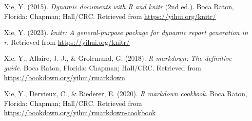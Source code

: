 \documentclass[
]{agujournal2019}
\newlength{\cslhangindent}
\newenvironment{CSLReferences}[2] %
 {\begin{list}{}{%
  \setlength{\itemindent}{0pt}
  \setlength{\leftmargin}{0pt}
  \setlength{\parsep}{0pt}
  \ifodd #1
   \setlength{\leftmargin}{\cslhangindent}
   \setlength{\itemindent}{-1\cslhangindent}
  \fi
  \setlength{\itemsep}{#2\baselineskip}}}
 {\end{list}}
\begin{document}
\begin{CSLReferences}{1}{0}
Xie, Y. (2015). \emph{Dynamic documents with {R} and knitr} (2nd ed.).
Boca Raton, Florida: Chapman; Hall/CRC. Retrieved from
\url{https://yihui.org/knitr/}

Xie, Y. (2023). \emph{{knitr}: A general-purpose package for dynamic
report generation in r}. Retrieved from \url{https://yihui.org/knitr/}

Xie, Y., Allaire, J. J., \& Grolemund, G. (2018). \emph{R markdown: The
definitive guide}. Boca Raton, Florida: Chapman; Hall/CRC. Retrieved
from \url{https://bookdown.org/yihui/rmarkdown}

Xie, Y., Dervieux, C., \& Riederer, E. (2020). \emph{R markdown
cookbook}. Boca Raton, Florida: Chapman; Hall/CRC. Retrieved from
\url{https://bookdown.org/yihui/rmarkdown-cookbook}

\end{CSLReferences}
\end{document}
